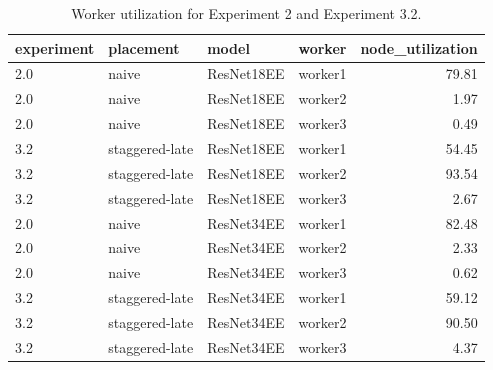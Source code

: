 \begin{table}
\centering
\caption{Worker utilization for Experiment 2 and Experiment 3.2.}
\label{tab:exp2-best-exp3-worker-utilization}
\begin{tabular}{llllr}
\toprule
experiment &      placement &      model &  worker &  node\_utilization \\
\midrule
       2.0 &          naive & ResNet18EE & worker1 &             79.81 \\
       2.0 &          naive & ResNet18EE & worker2 &              1.97 \\
       2.0 &          naive & ResNet18EE & worker3 &              0.49 \\
       3.2 & staggered-late & ResNet18EE & worker1 &             54.45 \\
       3.2 & staggered-late & ResNet18EE & worker2 &             93.54 \\
       3.2 & staggered-late & ResNet18EE & worker3 &              2.67 \\
       2.0 &          naive & ResNet34EE & worker1 &             82.48 \\
       2.0 &          naive & ResNet34EE & worker2 &              2.33 \\
       2.0 &          naive & ResNet34EE & worker3 &              0.62 \\
       3.2 & staggered-late & ResNet34EE & worker1 &             59.12 \\
       3.2 & staggered-late & ResNet34EE & worker2 &             90.50 \\
       3.2 & staggered-late & ResNet34EE & worker3 &              4.37 \\
\bottomrule
\end{tabular}
\end{table}
